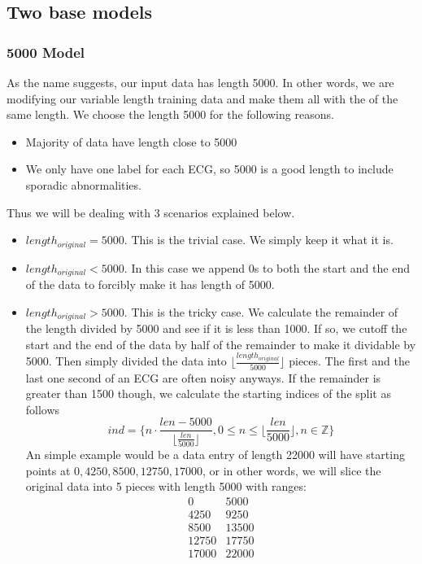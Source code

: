 \documentclass[%
 reprint,
 amsmath,amssymb,
 aps,
]{revtex4-2}
\begin{document}
\subsection{Two base models}
\subsubsection{5000 Model}
As the name suggests, our input data has length 5000. In other words, we are modifying our variable length training data and make them all with the of the same length. We choose the length 5000 for the following reasons. 
\begin{itemize}
	\item Majority of data have length close to 5000
	\item We only have one label for each ECG, so 5000 is a good length to include sporadic abnormalities.
\end{itemize}
Thus we will be dealing with 3 scenarios explained below.
\begin{itemize}
	\item $length_{original} = 5000$. This is the trivial case. We simply keep it what it is.
	\item $length_{original} < 5000$. In this case we append 0s to both the start and the end of the data to forcibly make it has length of 5000.
	\item $length_{original} > 5000$. This is the tricky case. We calculate the remainder of the length divided by 5000 and see if it is less than 1000. 
	\subitem If so, we cutoff the start and the end of the data by half of the remainder to make it dividable by 5000. Then simply divided the data into $\lfloor \frac{length_{original}}{5000} \rfloor$ pieces. The first and the last one second of an ECG are often noisy anyways.
	\subitem If the remainder is greater than 1500 though, we calculate the starting indices of the split as follows
	\begin{equation}
	ind = \{n \cdot \frac{len-5000}{\lfloor \frac{len}{5000} \rfloor}, 0 \leq n \leq \lfloor \frac{len}{5000} \rfloor, n \in \mathbb{Z}\}
	\end{equation}
	An simple example would be a data entry of length 22000 will have starting points at $0, 4250, 8500, 12750, 17000$, or in other words, we will slice the original data into 5 pieces with length 5000 with ranges:
	$$
	\begin{matrix}
		0&5000 \\
		4250&9250 \\
		8500&13500 \\
		12750&17750 \\
		17000&22000 \\
	\end{matrix}
	$$
\end{itemize}
\end{document}
